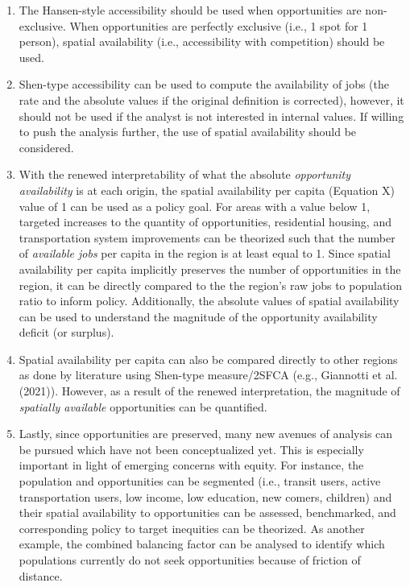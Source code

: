 \documentclass[]{elsarticle} %
\providecommand{\tightlist}{%
  \setlength{\itemsep}{0pt}\setlength{\parskip}{0pt}}
\begin{document}
\begin{enumerate}
\def\labelenumi{\arabic{enumi})}
\tightlist
\item
  The Hansen-style accessibility should be used when opportunities are
  non-exclusive. When opportunities are perfectly exclusive (i.e., 1
  spot for 1 person), spatial availability (i.e., accessibility with
  competition) should be used.
\item
  Shen-type accessibility can be used to compute the availability of
  jobs (the rate and the absolute values if the original definition is
  corrected), however, it should not be used if the analyst is not
  interested in internal values. If willing to push the analysis
  further, the use of spatial availability should be considered.
\item
  With the renewed interpretability of what the absolute
  \emph{opportunity availability} is at each origin, the spatial
  availability per capita (Equation X) value of 1 can be used as a
  policy goal. For areas with a value below 1, targeted increases to the
  quantity of opportunities, residential housing, and transportation
  system improvements can be theorized such that the number of
  \emph{available jobs} per capita in the region is at least equal to 1.
  Since spatial availability per capita implicitly preserves the number
  of opportunities in the region, it can be directly compared to the the
  region's raw jobs to population ratio to inform policy. Additionally,
  the absolute values of spatial availability can be used to understand
  the magnitude of the opportunity availability deficit (or surplus).
\item
  Spatial availability per capita can also be compared directly to other
  regions as done by literature using Shen-type measure/2SFCA (e.g.,
  Giannotti et al. (2021)). However, as a result of the renewed
  interpretation, the magnitude of \emph{spatially available}
  opportunities can be quantified.
\item
  Lastly, since opportunities are preserved, many new avenues of
  analysis can be pursued which have not been conceptualized yet. This
  is especially important in light of emerging concerns with equity. For
  instance, the population and opportunities can be segmented (i.e.,
  transit users, active transportation users, low income, low education,
  new comers, children) and their spatial availability to opportunities
  can be assessed, benchmarked, and corresponding policy to target
  inequities can be theorized. As another example, the combined
  balancing factor can be analysed to identify which populations
  currently do not seek opportunities because of friction of distance.
\end{enumerate}
\end{document}
